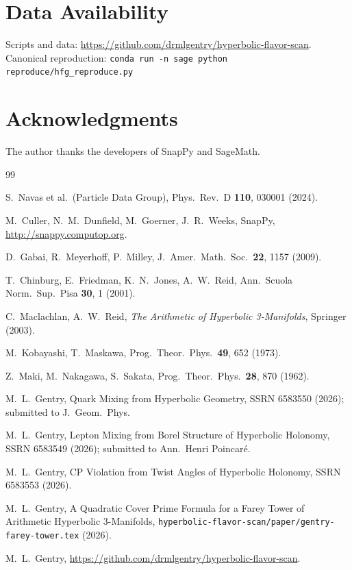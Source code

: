 \documentclass[11pt,a4paper]{article}
\theoremstyle{definition}
\theoremstyle{remark}
\begin{document}
\section*{Data Availability}
Scripts and data:
\url{https://github.com/drmlgentry/hyperbolic-flavor-scan}.
Canonical reproduction:
\texttt{conda run -n sage python reproduce/hfg\_reproduce.py}

\section*{Acknowledgments}
The author thanks the developers of SnapPy and SageMath.

\begin{thebibliography}{99}

S.~Navas et al.\ (Particle Data Group),
Phys.\ Rev.\ D \textbf{110}, 030001 (2024).

M.~Culler, N.~M.~Dunfield, M.~Goerner, J.~R.~Weeks,
SnapPy, \url{http://snappy.computop.org}.

D.~Gabai, R.~Meyerhoff, P.~Milley,
J.\ Amer.\ Math.\ Soc.\ \textbf{22}, 1157 (2009).

T.~Chinburg, E.~Friedman, K.~N.~Jones, A.~W.~Reid,
Ann.\ Scuola Norm.\ Sup.\ Pisa \textbf{30}, 1 (2001).

C.~Maclachlan, A.~W.~Reid,
\emph{The Arithmetic of Hyperbolic 3-Manifolds},
Springer (2003).

M.~Kobayashi, T.~Maskawa,
Prog.\ Theor.\ Phys.\ \textbf{49}, 652 (1973).

Z.~Maki, M.~Nakagawa, S.~Sakata,
Prog.\ Theor.\ Phys.\ \textbf{28}, 870 (1962).

M.~L.~Gentry,
Quark Mixing from Hyperbolic Geometry,
SSRN 6583550 (2026); submitted to J.\ Geom.\ Phys.

M.~L.~Gentry,
Lepton Mixing from Borel Structure of Hyperbolic Holonomy,
SSRN 6583549 (2026); submitted to Ann.\ Henri Poincar\'e.

M.~L.~Gentry,
CP Violation from Twist Angles of Hyperbolic Holonomy,
SSRN 6583553 (2026).

M.~L.~Gentry,
A Quadratic Cover Prime Formula for a Farey Tower
of Arithmetic Hyperbolic 3-Manifolds,
\texttt{hyperbolic-flavor-scan/paper/gentry-farey-tower.tex} (2026).

M.~L.~Gentry,
\url{https://github.com/drmlgentry/hyperbolic-flavor-scan}.

\end{thebibliography}
\end{document}
